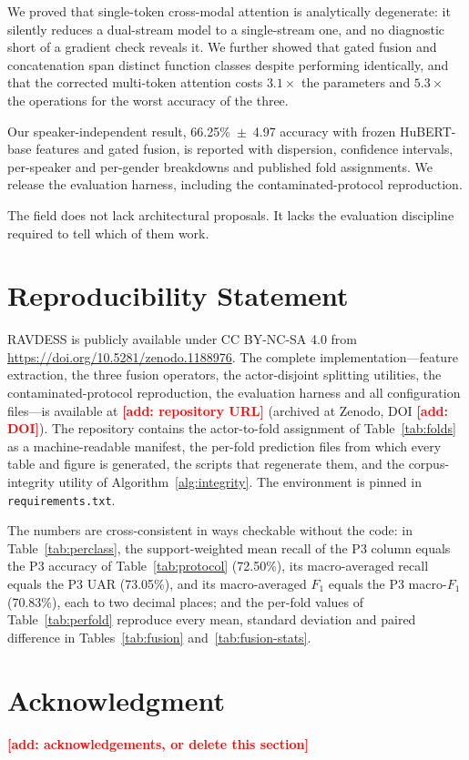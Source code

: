 \documentclass[journal,onecolumn,11pt,draftclsnofoot]{IEEEtran}   %
\newcommand{\TOADD}[1]{\textcolor{red}{\textbf{[add: #1]}}}
\newcommand{\TOADD}[1]{\textcolor{gray}{[#1]}}
\begin{document}
We proved that single-token cross-modal attention is analytically degenerate: it
silently reduces a dual-stream model to a single-stream one, and no diagnostic
short of a gradient check reveals it. We further showed that gated fusion and
concatenation span distinct function classes despite performing identically, and
that the corrected multi-token attention costs $3.1\times$ the parameters and
$5.3\times$ the operations for the worst accuracy of the three.

Our speaker-independent result, 66.25\%~$\pm$~4.97 accuracy with frozen
HuBERT-base features and gated fusion, is reported with dispersion, confidence
intervals, per-speaker and per-gender breakdowns and published fold assignments.
We release the evaluation harness, including the contaminated-protocol
reproduction.

The field does not lack architectural proposals. It lacks the evaluation
discipline required to tell which of them work.

\section*{Reproducibility Statement}
RAVDESS is publicly available under CC BY-NC-SA 4.0
\cite{livingstone2018ravdess} from \url{https://doi.org/10.5281/zenodo.1188976}.
The complete implementation---feature extraction, the three fusion operators,
the actor-disjoint splitting utilities, the contaminated-protocol reproduction,
the evaluation harness and all configuration files---is available at
\TOADD{repository URL} (archived at Zenodo, DOI \TOADD{DOI}). The repository
contains the actor-to-fold assignment of Table~\ref{tab:folds} as a
machine-readable manifest, the per-fold prediction files from which every table
and figure is generated, the scripts that regenerate them, and the
corpus-integrity utility of Algorithm~\ref{alg:integrity}. The environment is
pinned in \texttt{requirements.txt}.

The numbers are cross-consistent in ways checkable without the code: in
Table~\ref{tab:perclass}, the support-weighted mean recall of the P3 column
equals the P3 accuracy of Table~\ref{tab:protocol} (72.50\%), its macro-averaged
recall equals the P3 UAR (73.05\%), and its macro-averaged $F_1$ equals the P3
macro-$F_1$ (70.83\%), each to two decimal places; and the per-fold values of
Table~\ref{tab:perfold} reproduce every mean, standard deviation and paired
difference in Tables~\ref{tab:fusion} and~\ref{tab:fusion-stats}.

\section*{Acknowledgment}
\TOADD{acknowledgements, or delete this section}



\end{document}
